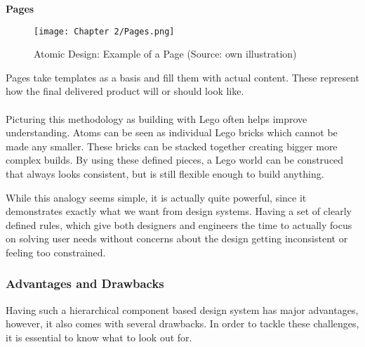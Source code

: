 \textbf{Pages}\\
\begin{figure}[H]
	\centering
    \texttt{[image: Chapter 2/Pages.png]}
    \caption{Atomic Design: Example of a Page (Source: own illustration)}
\end{figure}
Pages take templates as a basis and fill them with actual content. These represent how the final
delivered product will or should look like. \\
\\

Picturing this methodology as building with Lego often helps improve understanding. Atoms can be
seen as individual Lego bricks which cannot be made any smaller. These bricks can be stacked
together creating bigger more complex builds. By using these defined pieces, a Lego world can be
construced that always looks consistent, but is still flexible enough to build anything.

While this analogy seems simple, it is actually quite powerful, since it demonstrates exactly what
we want from design systems. Having a set of clearly defined rules, which give both designers and
engineers the time to actually focus on solving user needs without concerns about the design
getting inconsistent or feeling too constrained. 

\subsubsection{Advantages and Drawbacks}
Having such a hierarchical component based design system has major advantages, however, it also
comes with several drawbacks. In order to tackle these challenges, it is essential to know what to
look out for.


